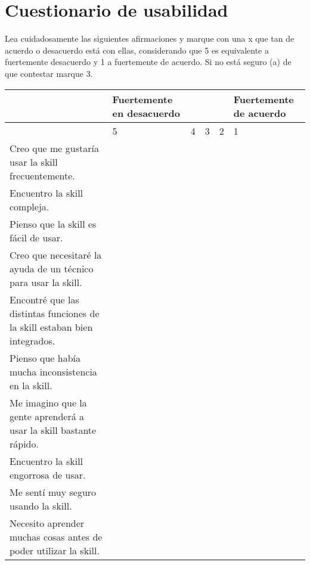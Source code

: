 
\section{Cuestionario de usabilidad}
\label{B5Anexo}

\begin{tcolorbox}[colback=white!25!white,colframe=blue]
  Lea cuidadosamente las siguientes afirmaciones y marque con una x que tan de acuerdo o desacuerdo está con ellas, considerando que 5 es equivalente a fuertemente desacuerdo y 1 a fuertemente de acuerdo. Si no está seguro (a) de que contestar marque 3.

  \begin{tabular}{| p{4cm} | p{2cm} | p{2cm} | p{2cm} | p{2cm} | p{2cm} |}
    \hline
     & \multicolumn{1}{p{2cm}}{Fuertemente en desacuerdo}  & \multicolumn{3}{p{2cm}}{} & Fuertemente de acuerdo \\ \hline
     & 5 & 4 & 3 & 2 & 1 \\ \hline
    Creo que me gustaría usar la skill frecuentemente. &  &  &  &  &  \\ \hline
    Encuentro la skill compleja. &  &  &  &  &  \\ \hline
    Pienso que la skill es fácil de usar. &  &  &  &  &  \\ \hline
    Creo que necesitaré la ayuda de un técnico para usar la skill. &  &  &  &  &  \\ \hline
    Encontré que las distintas funciones de la skill estaban bien integrados. &  &  &  &  &  \\ \hline
    Pienso que había mucha inconsistencia en la skill. &  &  &  &  &  \\ \hline
    Me imagino que la gente aprenderá a usar la skill bastante rápido. &  &  &  &  &  \\ \hline
    Encuentro la skill engorrosa de usar. &  &  &  &  &  \\ \hline
    Me sentí muy seguro usando la skill. &  &  &  &  &  \\ \hline
    Necesito aprender muchas cosas antes de poder utilizar la skill. &  &  &  &  &  \\ \hline
  \end{tabular}

\end{tcolorbox}


